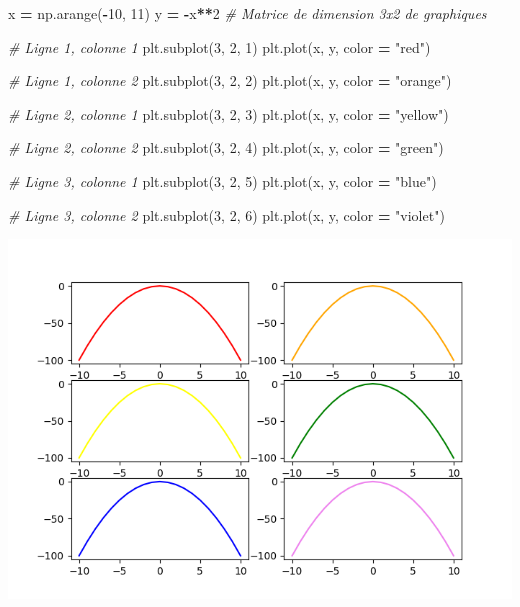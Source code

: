 \documentclass[12pt,]{book}
\newenvironment{Shaded}{\begin{snugshade}}{\end{snugshade}}
\newcommand{\DecValTok}[1]{\textcolor[rgb]{0.00,0.00,0.81}{#1}}
\newcommand{\StringTok}[1]{\textcolor[rgb]{0.31,0.60,0.02}{#1}}
\newcommand{\CommentTok}[1]{\textcolor[rgb]{0.56,0.35,0.01}{\textit{#1}}}
\newcommand{\OperatorTok}[1]{\textcolor[rgb]{0.81,0.36,0.00}{\textbf{#1}}}
\newcommand{\NormalTok}[1]{#1}
\numberwithin{equation}{section}
\numberwithin{countremarque}{section}
\begin{document}
\begin{Shaded}
\begin{Highlighting}[]
\NormalTok{x }\OperatorTok{=}\NormalTok{ np.arange(}\OperatorTok{-}\DecValTok{10}\NormalTok{, }\DecValTok{11}\NormalTok{)}
\NormalTok{y }\OperatorTok{=} \OperatorTok{-}\NormalTok{x}\OperatorTok{**}\DecValTok{2}
\CommentTok{# Matrice de dimension 3x2 de graphiques}

\CommentTok{# Ligne 1, colonne 1}
\NormalTok{plt.subplot(}\DecValTok{3}\NormalTok{, }\DecValTok{2}\NormalTok{, }\DecValTok{1}\NormalTok{)}
\NormalTok{plt.plot(x, y, color }\OperatorTok{=} \StringTok{"red"}\NormalTok{)}

\CommentTok{# Ligne 1, colonne 2}
\NormalTok{plt.subplot(}\DecValTok{3}\NormalTok{, }\DecValTok{2}\NormalTok{, }\DecValTok{2}\NormalTok{)}
\NormalTok{plt.plot(x, y, color }\OperatorTok{=} \StringTok{"orange"}\NormalTok{)}

\CommentTok{# Ligne 2, colonne 1}
\NormalTok{plt.subplot(}\DecValTok{3}\NormalTok{, }\DecValTok{2}\NormalTok{, }\DecValTok{3}\NormalTok{)}
\NormalTok{plt.plot(x, y, color }\OperatorTok{=} \StringTok{"yellow"}\NormalTok{)}

\CommentTok{# Ligne 2, colonne 2}
\NormalTok{plt.subplot(}\DecValTok{3}\NormalTok{, }\DecValTok{2}\NormalTok{, }\DecValTok{4}\NormalTok{)}
\NormalTok{plt.plot(x, y, color }\OperatorTok{=} \StringTok{"green"}\NormalTok{)}

\CommentTok{# Ligne 3, colonne 1}
\NormalTok{plt.subplot(}\DecValTok{3}\NormalTok{, }\DecValTok{2}\NormalTok{, }\DecValTok{5}\NormalTok{)}
\NormalTok{plt.plot(x, y, color }\OperatorTok{=} \StringTok{"blue"}\NormalTok{)}

\CommentTok{# Ligne 3, colonne 2}
\NormalTok{plt.subplot(}\DecValTok{3}\NormalTok{, }\DecValTok{2}\NormalTok{, }\DecValTok{6}\NormalTok{)}
\NormalTok{plt.plot(x, y, color }\OperatorTok{=} \StringTok{"violet"}\NormalTok{)}
\end{Highlighting}
\end{Shaded}

\begin{center}\includegraphics[width=9.03in]{figs/pyplot/subplot} \end{center}
\end{document}
